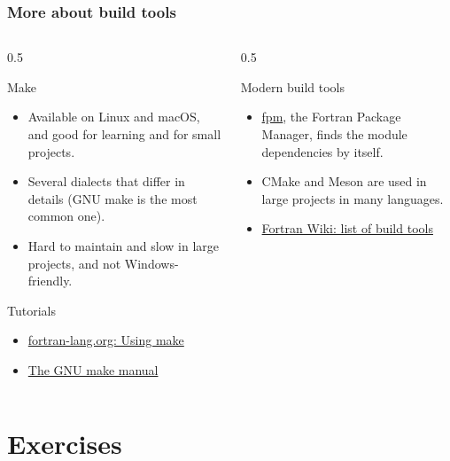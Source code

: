 \begin{frame}
  \frametitle{More about build tools}
  \begin{columns}[T]
    \begin{column}{0.5\textwidth}
      \begin{block}{Make}
        \begin{itemize}
          \item[+] Available on Linux and macOS, and good for learning and for small projects.
          \item[--] Several dialects that differ in details (GNU make is the most common one).
          \item[--] Hard to maintain and slow in large projects, and not Windows-friendly.
        \end{itemize}
      \end{block}
      \begin{block}{Tutorials}
        \begin{itemize}
          \item \href{https://fortran-lang.org/learn/building_programs/project_make/}{fortran-lang.org: Using make}
          \item \href{https://www.gnu.org/software/make/manual/}{The GNU make manual}
        \end{itemize}
      \end{block}
    \end{column}

    \begin{column}{0.5\textwidth}
      \begin{block}{Modern build tools}
        \begin{itemize}
          \item \href{https://fpm.fortran-lang.org}{fpm}, the Fortran Package Manager, finds the module dependencies by itself.
          \item CMake and Meson are used in large projects in many languages.
          \item \href{https://fortranwiki.org/fortran/show/Build+tools}{Fortran Wiki: list of build tools}
        \end{itemize}
      \end{block}
    \end{column}
  \end{columns}
\end{frame}


\section{Exercises}

